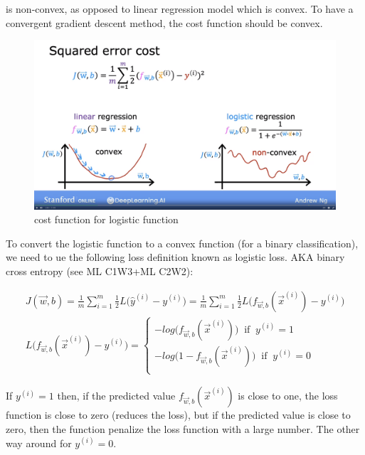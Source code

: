 \documentclass[12pt]{report}
\begin{document}
is non-convex, as opposed to linear regression model which is convex. To have a convergent gradient descent method, the cost function should be convex.

\begin{figure}[htbp]
  \begin{center}
    \includegraphics[trim =0cm 6.0cm 0cm 20.0cm, clip, scale=0.15]{pics/logistic.png}
    \caption{cost function for logistic function}
  \end{center}
\end{figure}

To convert the logistic function to a convex function (for a binary classification), we need to ue the following loss definition known as logistic loss. AKA binary cross entropy (see ML C1W3+ML C2W2):

\begin{multline}
J(\overrightarrow{w},b) = \frac{1}{m} \sum_{i=1}^{m} \frac{1}{2}  L\big(\hat{y}^{(i)}  - y^{(i)} \big) = \frac{1}{m} \sum_{i=1}^{m} \frac{1}{2}  L\big(f_{\overrightarrow{w},b} (\overrightarrow{x}^{(i)})   - y^{(i)} \big)\\
L\big(f_{\overrightarrow{w},b} (\overrightarrow{x}^{(i)})   - y^{(i)} \big) =
\begin{cases}
  -log\big( f_{\overrightarrow{w},b} (\overrightarrow{x}^{(i)}) \big)  \;\; \text{if} \;\; y^{(i)} = 1  \\
  -log\big(1-f_{\overrightarrow{w},b} (\overrightarrow{x}^{(i)}) \big)  \;\; \text{if} \;\; y^{(i)} = 0  \\
\end{cases}
\end{multline}

If $y^{(i)} = 1$ then, if the predicted value $f_{\overrightarrow{w},b} (\overrightarrow{x}^{(i)}) $ is close to one, the loss function is close to zero (reduces the loss), but if the predicted value is close to zero, then the function penalize the loss function with a large number. The other way around for $y^{(i)} = 0$.
\end{document}

